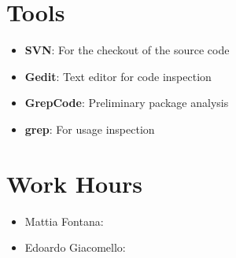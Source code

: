 \documentclass[11pt, a4paper,titlepage]{article}
\begin{document}
\section{Tools}
	\begin{itemize}
		\item \textbf{SVN}: For the checkout of the source code
		\item \textbf{Gedit}: Text editor for code inspection
		\item \textbf{GrepCode}: Preliminary package analysis
		\item \textbf{grep}: For usage inspection
	\end{itemize}
\section{Work Hours}
	\begin{itemize}
		\item Mattia Fontana:
		\item Edoardo Giacomello: 
	\end{itemize}
\end{document}
